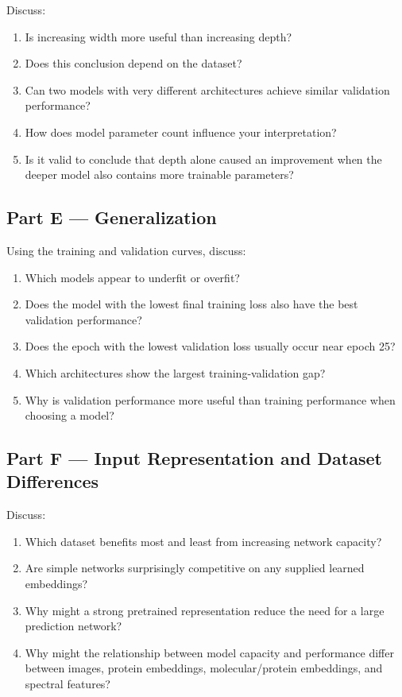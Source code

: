 \documentclass[11pt,a4paper]{article}
\begin{document}
Discuss:

\begin{enumerate}
    \item Is increasing width more useful than increasing depth?
    \item Does this conclusion depend on the dataset?
    \item Can two models with very different architectures achieve similar validation performance?
    \item How does model parameter count influence your interpretation?
    \item Is it valid to conclude that depth alone caused an improvement when the deeper model also contains more trainable parameters?
\end{enumerate}

\subsection*{Part E --- Generalization}

Using the training and validation curves, discuss:

\begin{enumerate}
    \item Which models appear to underfit or overfit?
    \item Does the model with the lowest final training loss also have the best validation performance?
    \item Does the epoch with the lowest validation loss usually occur near epoch 25?
    \item Which architectures show the largest training-validation gap?
    \item Why is validation performance more useful than training performance when choosing a model?
\end{enumerate}

\subsection*{Part F --- Input Representation and Dataset Differences}

Discuss:

\begin{enumerate}
    \item Which dataset benefits most and least from increasing network capacity?
    \item Are simple networks surprisingly competitive on any supplied learned embeddings?
    \item Why might a strong pretrained representation reduce the need for a large prediction network?
    \item Why might the relationship between model capacity and performance differ between images, protein embeddings, molecular/protein embeddings, and spectral features?
\end{enumerate}
\end{document}
